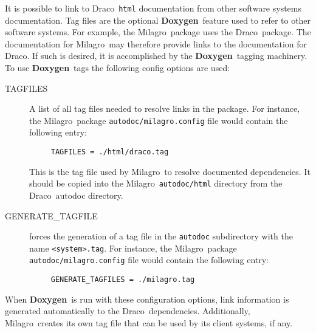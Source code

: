 \documentclass[11pt]{nmemo}
\newcommand{\draco}{{\normalfont\sffamily Draco}}
\newcommand{\milagro}{{\normalfont\sffamily Milagro}}
\newcommand{\doxy}{{\normalfont\bfseries Doxygen}}
\begin{document}
It is possible to link to \draco\ \texttt{html} documentation from other
software systems documentation.
Tag files are the  optional \doxy\ feature used to refer to other software systems. 
For example, the \milagro\
package uses the \draco\ package.  The documentation for \milagro\
may therefore provide links to the documentation for \draco.  If such is 
desired, it is  accomplished
by the \doxy\ tagging machinery.  To use \doxy\ tags the following
config options are used:
\begin{description}

\item[\ttfamily TAGFILES] A list of all tag files needed to resolve
  links in the package.  For instance, the \milagro\ package
  \texttt{autodoc/milagro.config} file would contain the following entry:
\begin{verbatim}
     TAGFILES = ./html/draco.tag
\end{verbatim}
  This is  the tag file used by \milagro\ to resolve documented
  dependencies. It should be copied into the \milagro\ \texttt{autodoc/html}
  directory from the \draco\ autodoc directory.

\item[\ttfamily GENERATE\_TAGFILE] forces the generation of
  a tag file in the \texttt{autodoc} subdirectory with the name 
  \texttt{<system>.tag}.
For instance, the \milagro\ package
  \texttt{autodoc/milagro.config} file would contain the following entry:
\begin{verbatim}
     GENERATE_TAGFILES = ./milagro.tag
\end{verbatim}

\end{description}
When \doxy\ is run with these configuration options, link information
is generated automatically to the \draco\ dependencies.  Additionally, 
\milagro\ creates its own tag file that can be used by its client
systems, if any.
\end{document}
